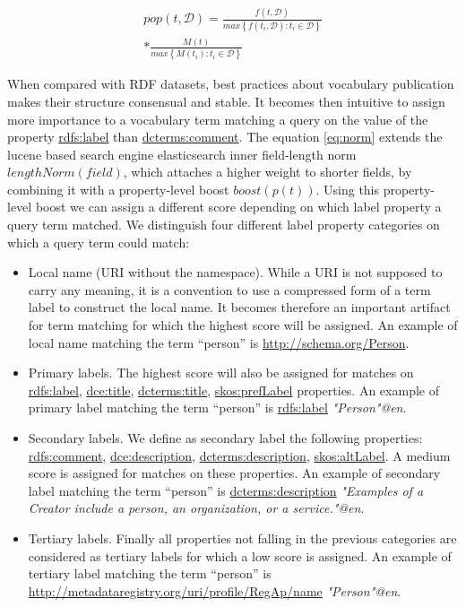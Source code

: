 \documentclass{iosart2c}
\begin{document}
\begin{equation}\label{eq:pop}
\begin{split}
pop(t,\mathcal{D}) = \frac{f(t,\mathcal{D})}{max\left\{f(t_i,\mathcal{D}): t_i \in \mathcal{D}\right\}} \\
* \frac{M(t)}{max\left\{M(t_i): t_i \in \mathcal{D}\right\}}
\end{split}
\end{equation}

When compared with RDF datasets, best practices about vocabulary publication makes their structure consensual and stable. It becomes then intuitive to assign more importance to a vocabulary term matching a query on the value of the property \url{rdfs:label} than \url{dcterms:comment}. The equation \ref{eq:norm} extends the lucene based search engine elasticsearch inner field-length norm $lengthNorm(field)$, which attaches a higher weight to shorter fields, by combining it with a property-level boost $boost(p(t))$. Using this property-level boost we can assign a different score depending on which label property a query term matched. We distinguish four different label property categories on which a query term could match: 
		\begin{itemize}
 			\item Local name (URI without the namespace). While a URI is not supposed to carry any meaning, it is a convention to use a compressed form of a term label to construct the local name. It becomes therefore an important artifact for term matching for which the highest score will be assigned. An example of local name matching the term ``person'' is \url{http://schema.org/Person}.
			\item Primary labels. The highest score will also be assigned for matches on \url{rdfs:label}, \url{dce:title}, \url{dcterms:title}, \url{skos:prefLabel} properties. An example of primary label matching the term ``person'' is \url{rdfs:label} \emph{"Person"@en}.
			\item Secondary labels. We define as secondary label the following properties: \url{rdfs:comment}, \url{dce:description}, \url{dcterms:description}, \url{skos:altLabel}. A medium score is assigned for matches on these properties. An example of secondary label matching the term ``person'' is \url{dcterms:description} \emph{"Examples of a Creator include a person, an organization, or a service."@en}.
			\item Tertiary labels. Finally all properties not falling in the previous categories are considered as tertiary labels for which a low score is assigned. An example of tertiary label matching the term ``person'' is \url{http://metadataregistry.org/uri/profile/RegAp/name} \emph{"Person"@en}. 
		\end{itemize}
\end{document}
